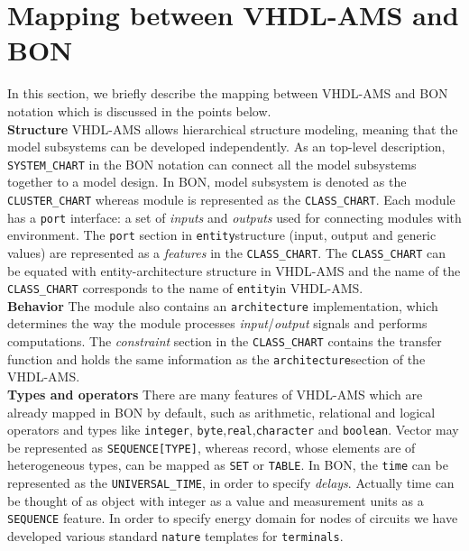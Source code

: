 \documentclass{article}
\def\lstinlinen{\lstinline[language=Bon,basicstyle=\normalsize\upshape]}
\newcommand{\ent}{entity\xspace}
\newcommand{\arch}{architecture\xspace}
\begin{document}
\section{Mapping between VHDL-AMS and BON}
\label{sec:mappingVB}
In this section, we briefly describe the mapping between VHDL-AMS and BON notation 
which is discussed in the points below.\\
\textbf{Structure} \xspace \xspace VHDL-AMS allows hierarchical structure 
modeling, meaning that the model subsystems can be developed independently.
As an top-level description, \lstinlinen|SYSTEM_CHART| in the BON notation  
can connect all the model subsystems  together to a model design.
In BON, model subsystem is denoted as the \lstinlinen|CLUSTER_CHART| whereas 
module is represented as the \lstinlinen|CLASS_CHART|.
Each module has a \texttt{port} interface: a set of \emph{inputs} and \emph{outputs} used for 
connecting modules with environment. The \texttt{port} section in 
\texttt{\ent}structure (input, output and generic values) are represented as 
a \emph{features} in the \lstinlinen|CLASS_CHART|.
The \lstinlinen|CLASS_CHART| \xspace can be equated with \ent-\arch 
structure in VHDL-AMS and the name of the \lstinlinen|CLASS_CHART|\xspace 
corresponds to the name of \texttt{\ent}in VHDL-AMS.\\ 
\textbf{Behavior} \xspace \xspace The module also contains an 
\texttt{\arch} implementation, which determines the way the module 
processes \emph{input}/\emph{output} signals and performs computations.
The \emph{constraint} section in the \lstinlinen|CLASS_CHART| 
contains the transfer function and holds the same information as 
the \texttt{\arch}section of the VHDL-AMS.\\ 
\textbf{Types and operators} \xspace \xspace There are many features of 
VHDL-AMS which are already mapped in BON by default, such as arithmetic, 
relational and logical operators and types like \xspace \texttt{integer},
\xspace \texttt{byte},\xspace\texttt{real},\xspace\texttt{character} and 
\xspace\texttt{boolean}.
Vector may be represented as \lstinlinen|SEQUENCE[TYPE]|, 
whereas record, whose elements are of heterogeneous types, can be mapped 
as \lstinlinen|SET| or \lstinlinen|TABLE|.
In BON, the \texttt{time} can be represented as the
\lstinlinen|UNIVERSAL_TIME|, in order to specify \emph{delays}. Actually 
time can be thought of as object with integer as a value and measurement 
units as a \xspace \lstinlinen|SEQUENCE| feature.     
In order to specify energy domain for nodes of circuits we have developed 
various standard \texttt{nature} templates for \texttt{terminals}.
\end{document}
